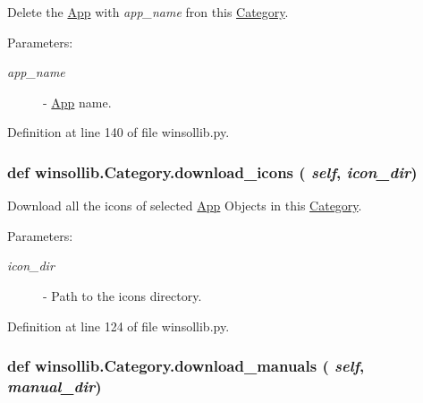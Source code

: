 Delete the \hyperlink{classwinsollib_1_1App}{App} with {\em app\_\-name\/} fron this \hyperlink{classwinsollib_1_1Category}{Category}. 

\begin{Desc}
\item[Parameters:]
\begin{description}
\item[{\em app\_\-name}]- \hyperlink{classwinsollib_1_1App}{App} name. \end{description}
\end{Desc}


Definition at line 140 of file winsollib.py.\hypertarget{classwinsollib_1_1Category_0fa4e42d829a086c9cdabcd9a6fba56c}{
\subsubsection[download\_\-icons]{\setlength{\rightskip}{0pt plus 5cm}def winsollib.Category.download\_\-icons ( {\em self},  {\em icon\_\-dir})}}
\label{classwinsollib_1_1Category_0fa4e42d829a086c9cdabcd9a6fba56c}


Download all the icons of selected \hyperlink{classwinsollib_1_1App}{App} Objects in this \hyperlink{classwinsollib_1_1Category}{Category}. 

\begin{Desc}
\item[Parameters:]
\begin{description}
\item[{\em icon\_\-dir}]- Path to the icons directory. \end{description}
\end{Desc}


Definition at line 124 of file winsollib.py.\hypertarget{classwinsollib_1_1Category_b6f4c885fe37c82bdce86c0efef21af7}{
\subsubsection[download\_\-manuals]{\setlength{\rightskip}{0pt plus 5cm}def winsollib.Category.download\_\-manuals ( {\em self},  {\em manual\_\-dir})}}
\label{classwinsollib_1_1Category_b6f4c885fe37c82bdce86c0efef21af7}


